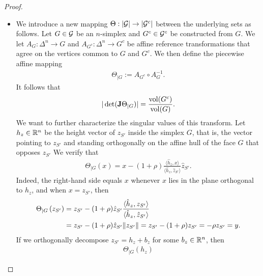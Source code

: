 \documentclass[10pt,a4paper]{article}
\begin{document}
\begin{proof}
\begin{itemize}
        
        \item 
        We introduce a new mapping $\Theta : \left| {\mathcal G} \right| \rightarrow \left| {\mathcal G}^c \right|$ between the underlying sets as follows.
        Let $G \in {\mathcal G}$ be an $n$-simplex and $G^{c} \in {\mathcal G}^{c}$ be constructed from $G$.
        We let $A_{G} : \Delta^{n} \rightarrow G$ and $A_{G^{c}} : \Delta^{n} \rightarrow G^{c}$
        be affine reference transformations
        that agree on the vertices common to $G$ and $G^{c}$.
        We then define the piecewise affine mapping 
        \begin{align*}
            \Theta_{|G} := A_{G^{c}} \circ A_{G}^{-1}.
        \end{align*}
        It follows that 
        \begin{align*}
            |\det( {\mathbf{J}}      \Theta_{|G} )| = \frac{\operatorname{vol}(G^{c})}{\operatorname{vol}(G)}
            .
        \end{align*}
        We want to further characterize the singular values of this transform. 
        Let $h_{z} \in {\mathbb R}^{n}$ be the height vector of $z_{S'}$ inside the simplex $G$,
        that is, the vector pointing to $z_{S'}$ and standing orthogonally on the affine hull of the face $G$ that opposes $z_{S'}$
        We verify that 
        \begin{align*}
            \Theta_{|G}(x) 
            = 
            x
            - 
            (1+\rho) \frac{\langle \hat h_{z}, x \rangle}{\langle \hat h_{z}, \hat z_{S'} \rangle}
            \hat z_{S'}
            .
        \end{align*}
        Indeed, the right-hand side equals $x$ whenever $x$ lies in the plane orthogonal to $h_{z}$,
        and when $x = z_{S'}$, then 
        \begin{align*}
            \Theta_{|G}\left( z_{S'} \right) 
            &
            =
            z_{S'}
            - 
            (1+\rho) \hat z_{S'} \frac{\langle \hat h_{z}, z_{S'} \rangle}{\langle \hat h_{z}, \hat z_{S'} \rangle}
            \\&
            =
            z_{S'}
            - 
            (1+\rho) \hat z_{S'} \| z_{S'} \|
            =
            z_{S'}
            - 
            (1+\rho) z_{S'} 
            =
            - \rho z_{S'} = y
            .
        \end{align*}
        If we orthogonally decompose $z_{S'} = h_{z} + b_{z}$ for some $b_{z} \in {\mathbb R}^{n}$, then 
        \begin{align*}
            \Theta_{|G}( h_{z} ) 

\end{align*}
\end{itemize}
\end{proof}
\end{document}
